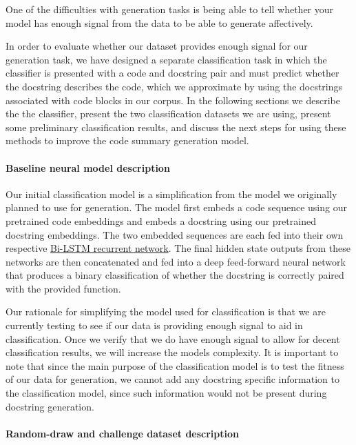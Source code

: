 \documentclass[article, 12pt, oneside]{memoir}
\begin{document}
One of the difficulties with generation tasks is being able to tell
whether your model has enough signal from the data to be able to
generate affectively.

In order to evaluate whether our dataset provides enough signal for our
generation task, we have designed a separate classification task in
which the classifier is presented with a code and docstring pair and
must predict whether the docstring describes the code, which we
approximate by using the docstrings associated with code blocks in our
corpus. In the following sections we describe the the classifier,
present the two classification datasets we are using, present some
preliminary classification results, and discuss the next steps for using
these methods to improve the code summary generation model.

\hypertarget{baseline-neural-model-description}{%
\paragraph{Baseline neural model
description}\label{baseline-neural-model-description}}

Our initial classification model is a simplification from the model we
originally planned to use for generation. The model first embeds a code
sequence using our pretrained code embeddings and embeds a docstring
using our pretrained docstring embeddings. The two embedded sequences
are each fed into their own respective
\href{https://pdfs.semanticscholar.org/4b80/89bc9b49f84de43acc2eb8900035f7d492b2.pdf}{Bi-LSTM
recurrent network}. The final hidden state outputs from these networks
are then concatenated and fed into a deep feed-forward neural network
that produces a binary classification of whether the docstring is
correctly paired with the provided function.

Our rationale for simplifying the model used for classification is that
we are currently testing to see if our data is providing enough signal
to aid in classification. Once we verify that we do have enough signal
to allow for decent classification results, we will increase the models
complexity. It is important to note that since the main purpose of the
classification model is to test the fitness of our data for generation,
we cannot add any docstring specific information to the classification
model, since such information would not be present during docstring
generation.

\hypertarget{random-draw-and-challenge-dataset-description}{%
\paragraph{Random-draw and challenge dataset
description}\label{random-draw-and-challenge-dataset-description}}
\end{document}
